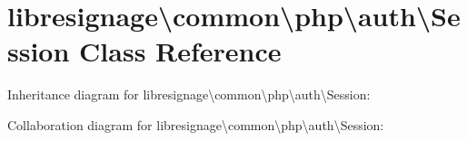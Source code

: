 \hypertarget{classlibresignage_1_1common_1_1php_1_1auth_1_1Session}{}\section{libresignage\textbackslash{}common\textbackslash{}php\textbackslash{}auth\textbackslash{}Session Class Reference}
\label{classlibresignage_1_1common_1_1php_1_1auth_1_1Session}


Inheritance diagram for libresignage\textbackslash{}common\textbackslash{}php\textbackslash{}auth\textbackslash{}Session\+:


Collaboration diagram for libresignage\textbackslash{}common\textbackslash{}php\textbackslash{}auth\textbackslash{}Session\+:
